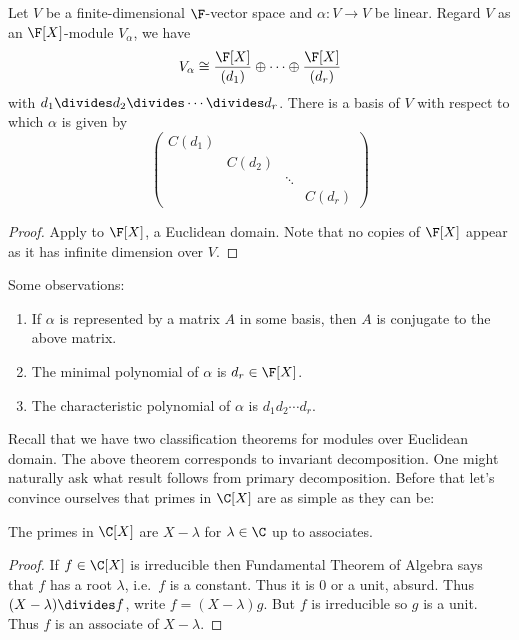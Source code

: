 \documentclass[a4paper]{article}
\begin{document}
\begin{theorem}
  Let \(V\) be a finite-dimensional \(\F\)-vector space and \(\alpha: V \to V\) be linear. Regard \(V\) as an \(\F[X]\)-module \(V_\alpha\), we have
  \[
    V_\alpha \cong \frac{\F[X]}{(d_1)} \oplus \dots \oplus \frac{\F[X]}{(d_r)}
  \]
  with \(d_1 \divides d_2 \divides \cdots \divides d_r\). There is a basis of \(V\) with respect to which \(\alpha\) is given by
  \[
    \begin{pmatrix}
      C(d_1) \\
      & C(d_2) \\
      & & \ddots \\
      & & & C(d_r)
    \end{pmatrix}
  \]
\end{theorem}

\begin{proof}
  Apply  to \(\F[X]\), a Euclidean domain. Note that no copies of \(\F[X]\) appear as it has infinite dimension over \(V\).
\end{proof}

Some observations:
\begin{enumerate}
\item If \(\alpha\) is represented by a matrix \(A\) in some basis, then \(A\) is conjugate to the above matrix.
\item The minimal polynomial of \(\alpha\) is \(d_r \in \F[X]\).
\item The characteristic polynomial of \(\alpha\) is \(d_1d_2\cdots d_r\).
\end{enumerate}

Recall that we have two classification theorems for modules over Euclidean domain. The above theorem corresponds to invariant decomposition. One might naturally ask what result follows from primary decomposition. Before that let's convince ourselves that primes in \(\C[X]\) are as simple as they can be:

\begin{lemma}
  The primes in \(\C[X]\) are \(X - \lambda\) for \(\lambda \in \C\) up to associates.
\end{lemma}

\begin{proof}
  If \(f \in \C[X]\) is irreducible then Fundamental Theorem of Algebra says that \(f\) has a root \(\lambda\), i.e.\ \(f\) is a constant. Thus it is \(0\) or a unit, absurd. Thus \((X - \lambda) \divides f\), write \(f = (X - \lambda) g\). But \(f\) is irreducible so \(g\) is a unit. Thus \(f\) is an associate of \(X - \lambda\).
\end{proof}
\end{document}
